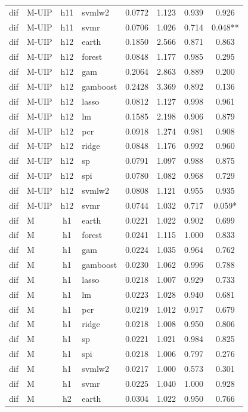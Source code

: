 \begin{ThreePartTable}
\begin{longtable}[t]{llclcccc}
dif & M-UIP & h11 & svmlw2 & 0.0772 & 1.123 & 0.939 & 0.926\\
dif & M-UIP & h11 & svmr & 0.0706 & 1.026 & 0.714 & 0.048**\\
\addlinespace
dif & M-UIP & h12 & earth & 0.1850 & 2.566 & 0.871 & 0.863\\
dif & M-UIP & h12 & forest & 0.0848 & 1.177 & 0.985 & 0.295\\
dif & M-UIP & h12 & gam & 0.2064 & 2.863 & 0.889 & 0.200\\
dif & M-UIP & h12 & gamboost & 0.2428 & 3.369 & 0.892 & 0.136\\
dif & M-UIP & h12 & lasso & 0.0812 & 1.127 & 0.998 & 0.961\\
dif & M-UIP & h12 & lm & 0.1585 & 2.198 & 0.906 & 0.879\\
dif & M-UIP & h12 & pcr & 0.0918 & 1.274 & 0.981 & 0.908\\
dif & M-UIP & h12 & ridge & 0.0848 & 1.176 & 0.992 & 0.960\\
dif & M-UIP & h12 & sp & 0.0791 & 1.097 & 0.988 & 0.875\\
dif & M-UIP & h12 & spi & 0.0780 & 1.082 & 0.968 & 0.729\\
dif & M-UIP & h12 & svmlw2 & 0.0808 & 1.121 & 0.955 & 0.935\\
dif & M-UIP & h12 & svmr & 0.0744 & 1.032 & 0.717 & 0.059*\\
\addlinespace
dif & M & h1 & earth & 0.0221 & 1.022 & 0.902 & 0.699\\
dif & M & h1 & forest & 0.0241 & 1.115 & 1.000 & 0.833\\
dif & M & h1 & gam & 0.0224 & 1.035 & 0.964 & 0.762\\
dif & M & h1 & gamboost & 0.0230 & 1.062 & 0.996 & 0.788\\
dif & M & h1 & lasso & 0.0218 & 1.007 & 0.929 & 0.733\\
dif & M & h1 & lm & 0.0223 & 1.028 & 0.940 & 0.681\\
dif & M & h1 & pcr & 0.0219 & 1.012 & 0.917 & 0.679\\
dif & M & h1 & ridge & 0.0218 & 1.008 & 0.950 & 0.806\\
dif & M & h1 & sp & 0.0221 & 1.021 & 0.984 & 0.825\\
dif & M & h1 & spi & 0.0218 & 1.006 & 0.797 & 0.276\\
dif & M & h1 & svmlw2 & 0.0217 & 1.000 & 0.573 & 0.301\\
dif & M & h1 & svmr & 0.0225 & 1.040 & 1.000 & 0.928\\
\addlinespace
dif & M & h2 & earth & 0.0304 & 1.022 & 0.950 & 0.766\\

\end{longtable}
\end{ThreePartTable}
